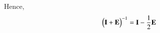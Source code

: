\documentclass[journal,12pt,twocolumn]{IEEEtran}
\begin{document}
	Hence,
	\begin{align}
	\begin{pmatrix}\mathbf{I} + \mathbf{E}\end{pmatrix}^{-1} =\mathbf{I} - \frac{1}{2}\mathbf{E} \label{2.27}
	\end{align}
	
\end{document}
